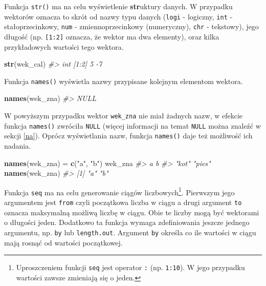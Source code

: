 \documentclass[paper=6in:9in,pagesize=pdftex,headinclude=on,footinclude=on,10pt]{scrbook}
\newenvironment{Shaded}{\begin{snugshade}}{\end{snugshade}}
\newcommand{\CommentTok}[1]{\textcolor[rgb]{0.56,0.35,0.01}{\textit{#1}}}
\newcommand{\KeywordTok}[1]{\textcolor[rgb]{0.13,0.29,0.53}{\textbf{#1}}}
\newcommand{\NormalTok}[1]{#1}
\newcommand{\StringTok}[1]{\textcolor[rgb]{0.31,0.60,0.02}{#1}}
\begin{document}
Funkcja \texttt{str()} ma na celu wyświetlenie \textbf{str}uktury danych.
W przypadku wektorów oznacza to skrót od nazwy typu danych (\texttt{logi} - logiczny, \texttt{int} - stałoprzecinkowy, \texttt{num} - zmiennoprzecinkowy (numeryczny), \texttt{chr} - tekstowy), jego długość (np. \texttt{{[}1:2{]}} oznacza, że wektor ma dwa elementy), oraz kilka przykładowych wartości tego wektora.

\begin{Shaded}
\begin{Highlighting}[]
\KeywordTok{str}\NormalTok{(wek_cal)}
\CommentTok{#>  int [1:2] 5 -7}
\end{Highlighting}
\end{Shaded}

Funkcja \texttt{names()} wyświetla nazwy przypisane kolejnym elementom wektora.

\begin{Shaded}
\begin{Highlighting}[]
\KeywordTok{names}\NormalTok{(wek_zna)}
\CommentTok{#> NULL}
\end{Highlighting}
\end{Shaded}

W powyższym przypadku wektor \texttt{wek\_zna} nie miał żadnych nazw, w efekcie funkcja \texttt{names()} zwróciła \texttt{NULL} (więcej informacji na temat \texttt{NULL} można znaleźć w sekcji \ref{na}).
Oprócz wyświetlania nazw, funkcja \texttt{names()} daje też możliwość ich nadania.

\begin{Shaded}
\begin{Highlighting}[]
\KeywordTok{names}\NormalTok{(wek_zna) =}\StringTok{ }\KeywordTok{c}\NormalTok{(}\StringTok{"a"}\NormalTok{, }\StringTok{"b"}\NormalTok{)}
\NormalTok{wek_zna}
\CommentTok{#>      a      b }
\CommentTok{#>  "kot" "pies"}
\KeywordTok{names}\NormalTok{(wek_zna)}
\CommentTok{#> [1] "a" "b"}
\end{Highlighting}
\end{Shaded}

Funkcja \texttt{seq} ma na celu generowanie ciągów liczbowych\footnote{Uproszczeniem funkcji \texttt{seq} jest operator \texttt{:} (np. \texttt{1:10}). W jego przypadku wartości zawsze zmieniają się o jeden.}.
Pierwszym jego argumentem jest \texttt{from} czyli początkowa liczba w ciągu a drugi argument \texttt{to} oznacza maksymalną możliwą liczbę w ciągu.
Obie te liczby mogą być wektorami o długości jeden.
Dodatkowo ta funkcja wymaga zdefiniowania jeszcze jednego argumentu, np. \texttt{by} lub \texttt{length.out}.
Argument \texttt{by} określa co ile wartości w ciągu mają rosnąć od wartości początkowej.
\end{document}
